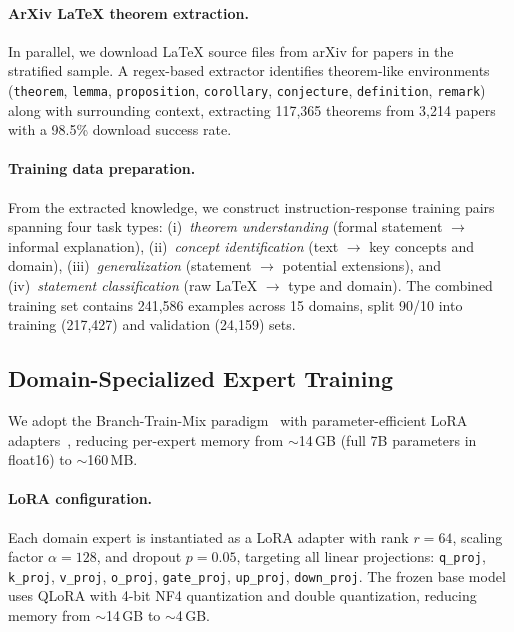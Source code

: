 \documentclass[11pt,a4paper]{article}
\begin{document}
\paragraph{ArXiv LaTeX theorem extraction.}
In parallel, we download LaTeX source files from arXiv for papers in the stratified sample. A regex-based extractor identifies theorem-like environments (\texttt{theorem}, \texttt{lemma}, \texttt{proposition}, \texttt{corollary}, \texttt{conjecture}, \texttt{definition}, \texttt{remark}) along with surrounding context, extracting 117,365 theorems from 3,214 papers with a 98.5\% download success rate.

\paragraph{Training data preparation.}
From the extracted knowledge, we construct instruction-response training pairs spanning four task types: (i)~\emph{theorem understanding} (formal statement $\to$ informal explanation), (ii)~\emph{concept identification} (text $\to$ key concepts and domain), (iii)~\emph{generalization} (statement $\to$ potential extensions), and (iv)~\emph{statement classification} (raw LaTeX $\to$ type and domain). The combined training set contains 241,586 examples across 15 domains, split 90/10 into training (217,427) and validation (24,159) sets.

\subsection{Domain-Specialized Expert Training}
\label{sec:btm}

We adopt the Branch-Train-Mix paradigm~\citep{sukhbaatar2024branch} with parameter-efficient LoRA adapters~\citep{hu2022lora}, reducing per-expert memory from ${\sim}$14\,GB (full 7B parameters in float16) to ${\sim}$160\,MB.

\paragraph{LoRA configuration.}
Each domain expert is instantiated as a LoRA adapter with rank $r{=}64$, scaling factor $\alpha{=}128$, and dropout $p{=}0.05$, targeting all linear projections: \texttt{q\_proj}, \texttt{k\_proj}, \texttt{v\_proj}, \texttt{o\_proj}, \texttt{gate\_proj}, \texttt{up\_proj}, \texttt{down\_proj}. The frozen base model uses QLoRA with 4-bit NF4 quantization and double quantization, reducing memory from ${\sim}$14\,GB to ${\sim}$4\,GB.
\end{document}
